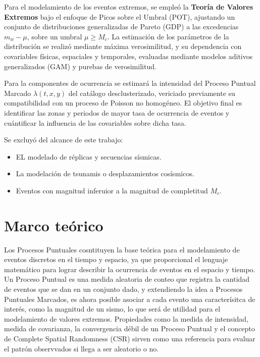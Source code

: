 Para el modelamiento de los eventos extremos, se empleó la \textbf{Teoría de Valores Extremos} bajo el enfoque de Picos sobre el Umbral (POT), ajustando un conjunto de distribuciones generalizadas de Pareto (GDP) a las excedencias
$m_w-\mu$, sobre un umbral $\mu\geq M_c$. La estimación de los parámetros de la distribución se realizó mediante máxima verosimilitud, y su dependencia con covariables físicas, espaciales y temporales, evaluadas mediante
modelos aditivos generalizados (GAM) y purebas de verosimilitud.

Para la componentes de ocurrencia se estimará la intensidad del Proceso Puntual Marcado $\lambda(t, x, y)$ del catálogo desclusterizado, vericiado previamente su compatibilidad con un proceso de Poisson no homogéneo. El objetivo final es
identificar las zonas y periodos de mayor tasa de ocurrencia de eventos y cuántificar la influencia de las covariables sobre dicha tasa.

Se excluyó del alcance de este trabajo:
\begin{itemize}
    \item EL modelado de réplicas y secuencias sísmicas.
    \item La modelación de tsunamis o desplazamientos cosísmicos.
    \item Eventos con magnitud inferuior a la magnitud de completitud $M_c$.    
\end{itemize}

\section{Marco teórico}
Los Procesos Puntuales cosntituyen la base teórica para el modelamiento de eventos discretos en el tiempo y espacio, ya
que proporcional el lenguaje matemático para lograr describir la ocurrencia de eventos en el espacio y tiempo. Un Proceso
Puntual es una medida aleatoria de conteo que registra la cantidad de eventos que se dan en un conjunto dado, y extendiendo la idea a
Procesos Puntuales Marcados, es ahora posible asociar a cada evento una caracterísitca de interés, como la magnitud de un sismo, lo que
será de utilidad para el modelamiento de valores extremos. Propiedades como la medida de intensidad, medida de covarianza, la convergencia 
débil de un Proceso Puntual y el concepto de Complete Spatial Randomness (CSR) sirven como una referencia para evaluar el patrón observvados si
llega a ser aleatorio o no.

